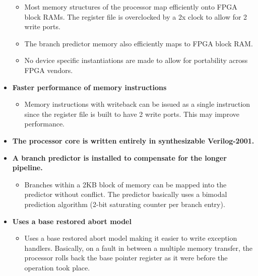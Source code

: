 \documentclass[11pt]{article}
\begin{document}
\begin{itemize}
        \begin{itemize}

        \item Most memory structures of the processor map efficiently onto FPGA 
        block RAMs. The register file is overclocked by a 2x clock to allow for 
        2 write ports.

        \item The branch predictor memory also efficiently maps to FPGA block
        RAM.

        \item No device specific instantiations are made to allow for portability
        across FPGA vendors.

        \end{itemize}

\item \textbf{Faster performance of memory instructions}

        \begin{itemize}

        \item Memory instructions with writeback can be issued as a
        single instruction since the register file is built to have 2 write
        ports. This may improve performance.

        \end{itemize}

\item 
        \textbf{The processor core is written entirely in synthesizable 
        Verilog-2001.}

\item \textbf{A branch predictor is installed to compensate for the longer 
        pipeline.}

        \begin{itemize}

        \item Branches within a 2KB block of memory can be mapped into the 
        predictor without conflict. The predictor basically uses a bimodal
        prediction algorithm (2-bit saturating counter per branch entry).

        \end{itemize}

\item \textbf{Uses a base restored abort model}

        \begin{itemize}

        \item
        Uses a base restored abort model making it easier to write exception
        handlers. Basically, on a fault in between a multiple memory transfer, 
        the processor rolls back the base pointer register as it were before 
        the operation took place.

        \end{itemize}

\end{itemize}
\end{document}
